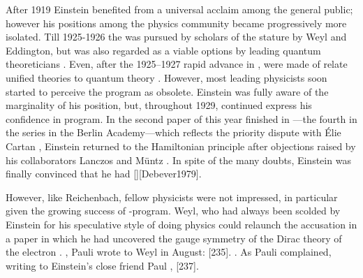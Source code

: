 \documentclass[draft]{article}
\newcommand{\FP}{\german{Fernparallelismus}\xspace}
\begin{document}
After 1919 Einstein benefited from a universal acclaim among the general public; however his positions among the physics community became progressively more isolated. Till 1925-1926 the \uftp was pursued by scholars of the stature by Weyl and Eddington, but was also regarded as a viable options by leading quantum theoreticians \citep[209]{Vizgin1994}. Even, after the 1925--1927 rapid advance in \qm, were made of relate unified theories to quantum theory \citep{Klein1926a}. However, most leading physicists  soon started to perceive the program as obsolete. Einstein was fully aware of the marginality of his position, but, throughout 1929, continued express his confidence in \FP program. In the second paper of this year finished in ---the fourth in the series in the Berlin Academy---which reflects the priority dispute with Élie Cartan \citep{Debever1979}, Einstein returned to the Hamiltonian principle after objections raised by his collaborators Lanczos and Müntz \citep{Einstein1930c}.  In spite of the many doubts, Einstein was finally convinced that he had  [][Debever1979].

However, like Reichenbach, fellow physicists were not impressed, in particular given the growing success of \qm-program. Weyl, who had always been scolded by Einstein for his speculative style of doing physics could relaunch the accusation in a paper \citep{Weyl1929c} in which he had uncovered the gauge symmetry of the Dirac theory of the electron . , Pauli wrote to Weyl in August:  [235].   \citep{Goldstein2003}. As Pauli complained, writing to Einstein's close friend Paul \Ehr,  [237].

\end{document}
